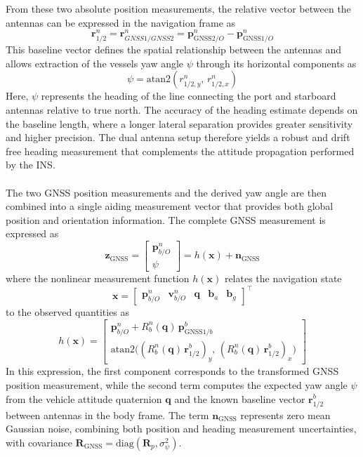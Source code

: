 \\ \\
From these two absolute position measurements, the relative vector between the antennas can be expressed in the navigation frame as
$$
    \mathbf{r}_{1/2}^{n} = \mathbf{r}_{GNSS1/GNSS2}^{n} = \mathbf{p}_{\text{GNSS2}/O}^{n} - \mathbf{p}_{\text{GNSS1}/O}^{n}
$$
This baseline vector defines the spatial relationship between the antennas and allows extraction of the vessels yaw angle $\psi$ through its horizontal components as
$$
    \psi = \text{atan2}(r_{1/2,y}^{n},\, r_{1/2,x}^{n})
$$
Here, $\psi$ represents the heading of the line connecting the port and starboard antennas relative to true north. The accuracy of the heading estimate depends on the baseline length, where a longer lateral separation provides greater sensitivity and higher precision. The dual antenna setup therefore yields a robust and drift free heading measurement that complements the attitude propagation performed by the INS.  
\\ \\
The two GNSS position measurements and the derived yaw angle are then combined into a single aiding measurement vector that provides both global position and orientation information. The complete GNSS measurement is expressed as
$$
    \mathbf{z}_{\text{GNSS}} =
    \begin{bmatrix}
        \mathbf{p}_{b/O}^{n} \\
        \psi
    \end{bmatrix}
    = h(\mathbf{x}) + \mathbf{n}_{\text{GNSS}}
$$
where the nonlinear measurement function $h(\mathbf{x})$ relates the navigation state
$$
    \mathbf{x} =
    \begin{bmatrix}
        \mathbf{p}_{b/O}^{n} & \mathbf{v}_{b/O}^{n} & \mathbf{q} & \mathbf{b}_a & \mathbf{b}_g
    \end{bmatrix}^\top
$$
to the observed quantities as
\begin{equation}
    h(\mathbf{x}) =
    \begin{bmatrix}
        \mathbf{p}_{b/O}^{n} + R_b^n(\mathbf{q})\,\mathbf{p}_{\text{GNSS1}/b}^{b} \\
        \text{atan2}\big((R_b^n(\mathbf{q})\,\mathbf{r}_{1/2}^{b})_y,\,(R_b^n(\mathbf{q})\,\mathbf{r}_{1/2}^{b})_x\big)
    \end{bmatrix}
    \label{eq:aiding-measurement-model}
\end{equation}
In this expression, the first component corresponds to the transformed GNSS position measurement, while the second term computes the expected yaw angle $\psi$ from the vehicle attitude quaternion $\mathbf{q}$ and the known baseline vector $\mathbf{r}_{1/2}^{b}$ between antennas in the body frame. The term $\mathbf{n}_{\text{GNSS}}$ represents zero mean Gaussian noise, combining both position and heading measurement uncertainties, with covariance $\mathbf{R}_{\text{GNSS}} = \text{diag}(\mathbf{R}_{p}, \sigma_\psi^2)$.
